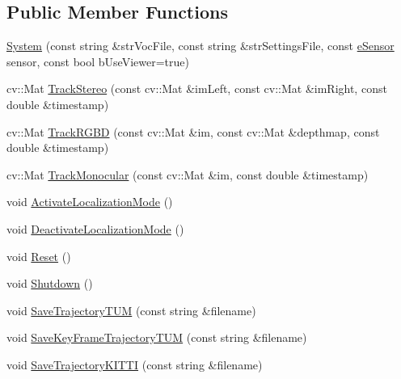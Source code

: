 \subsection*{Public Member Functions}
\begin{DoxyCompactItemize}
\item 
\mbox{\hyperlink{class_o_r_b___s_l_a_m2_1_1_system_a687bbabebe054f6d40b44b1ba64bc57a}{System}} (const string \&str\+Voc\+File, const string \&str\+Settings\+File, const \mbox{\hyperlink{class_o_r_b___s_l_a_m2_1_1_system_a3f14b84bb9663e1129e649e592bd14cf}{e\+Sensor}} sensor, const bool b\+Use\+Viewer=true)
\item 
cv\+::\+Mat \mbox{\hyperlink{class_o_r_b___s_l_a_m2_1_1_system_a61226615f8d33afee19bb4ca188cc021}{Track\+Stereo}} (const cv\+::\+Mat \&im\+Left, const cv\+::\+Mat \&im\+Right, const double \&timestamp)
\item 
cv\+::\+Mat \mbox{\hyperlink{class_o_r_b___s_l_a_m2_1_1_system_a3b5be10e71c3484c11171bca16cdcd8e}{Track\+R\+G\+BD}} (const cv\+::\+Mat \&im, const cv\+::\+Mat \&depthmap, const double \&timestamp)
\item 
cv\+::\+Mat \mbox{\hyperlink{class_o_r_b___s_l_a_m2_1_1_system_a0408659bafa31c4d0722ccd032fb9430}{Track\+Monocular}} (const cv\+::\+Mat \&im, const double \&timestamp)
\item 
void \mbox{\hyperlink{class_o_r_b___s_l_a_m2_1_1_system_a6cd39ec31a23d7ba5ebe1a6e4f4a0f89}{Activate\+Localization\+Mode}} ()
\item 
void \mbox{\hyperlink{class_o_r_b___s_l_a_m2_1_1_system_a3bb91bfb9547b01596dac3e9fdd4adfd}{Deactivate\+Localization\+Mode}} ()
\item 
void \mbox{\hyperlink{class_o_r_b___s_l_a_m2_1_1_system_a33f5eb6f33d14cdda2a889fe06d6619e}{Reset}} ()
\item 
void \mbox{\hyperlink{class_o_r_b___s_l_a_m2_1_1_system_aa934876a230dfa99e123f62b4b54d0cb}{Shutdown}} ()
\item 
void \mbox{\hyperlink{class_o_r_b___s_l_a_m2_1_1_system_a118df14a34bac039f9880c886ee3678f}{Save\+Trajectory\+T\+UM}} (const string \&filename)
\item 
void \mbox{\hyperlink{class_o_r_b___s_l_a_m2_1_1_system_a6435a029f66a34103c434aa16e80eae3}{Save\+Key\+Frame\+Trajectory\+T\+UM}} (const string \&filename)
\item 
void \mbox{\hyperlink{class_o_r_b___s_l_a_m2_1_1_system_a3a28b57ac7267d5c51d3b8492d2f5d5c}{Save\+Trajectory\+K\+I\+T\+TI}} (const string \&filename)
\end{DoxyCompactItemize}
